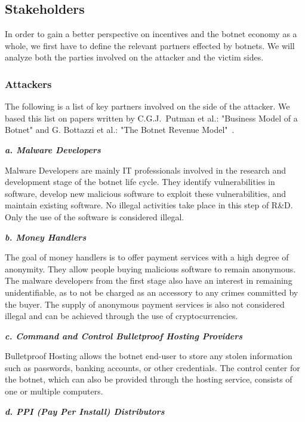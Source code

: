 \subsection{Stakeholders}
In order to gain a better perspective on incentives and the botnet economy as a whole, we first have to define the relevant partners effected by botnets.
We will analyze both the parties involved on the attacker and the victim sides.

\subsubsection{Attackers}

The following is a list of key partners involved on the side of the attacker.
We based this list on papers written by C.G.J.\ Putman et al.: "Business Model of a Botnet" and G. Bottazzi et al.: "The Botnet Revenue Model"~\cite{Putman,Bottazzi14}.

\textbf{\textit{a. Malware Developers}}

Malware Developers are mainly IT professionals involved in the research and development stage of the botnet life cycle.
They identify vulnerabilities in software, develop new malicious software to exploit these vulnerabilities, and maintain existing software.
No illegal activities take place in this step of R\&D. Only the use of the software is considered illegal.~\cite{Putman,Bottazzi14}

\textbf{\textit{b. Money Handlers}}

The goal of money handlers is to offer payment services with a high degree of anonymity.
They allow people buying malicious software to remain anonymous.
The malware developers from the first stage also have an interest in remaining unidentifiable, as to not be charged as an accessory to any crimes committed by the buyer.
The supply of anonymous payment services is also not considered illegal and can be achieved through the use of cryptocurrencies.\cite{Putman,Bottazzi14}

\textbf{\textit{c. Command and Control Bulletproof Hosting Providers}}

Bulletproof Hosting allows the botnet end-user to store any stolen information such as passwords, banking accounts, or other credentials.
The control center for the botnet, which can also be provided through the hosting service, consists of one or multiple computers.\cite{Putman,Bottazzi14}

\textbf{\textit{d. PPI (Pay Per Install) Distributors}}

